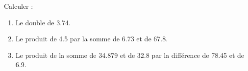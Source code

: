\begin{exercice*}
   Calculer :
   \begin{enumerate}
      \item Le double de \num{3.74}.
      \item Le produit de \num{4.5} par la somme de \num{6.73} et de \num{67.8}.
      \item Le produit de la somme de \num{34.879} et de \num{32.8} par la différence de \num{78.45} et de \num{6.9}.
   \end{enumerate}
\end{exercice*}
 